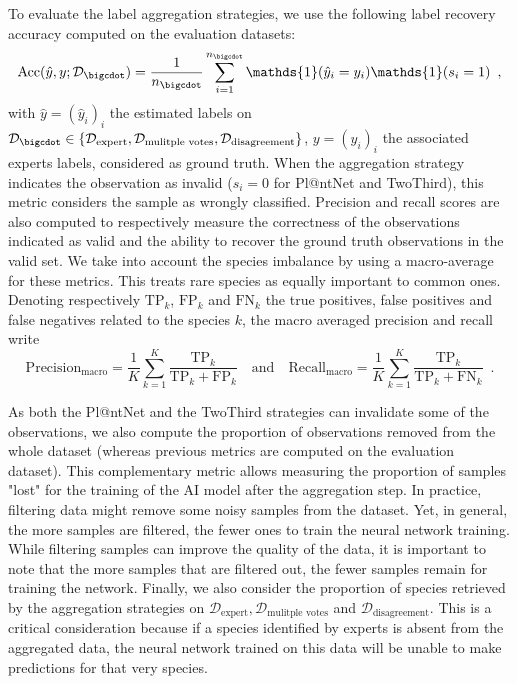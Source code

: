 To evaluate the label aggregation strategies, we use the following label recovery accuracy computed on the evaluation datasets:
\begin{equation*}
    \mathrm{Acc}(\hat y, y; \mathcal{D}_{\bigcdot}) = \frac{1}{n_{\bigcdot}} \sum_{i=1}^{n_{\bigcdot}} \mathds{1}(\hat{y}_i = y_i)\mathds{1}(s_i=1) \enspace,
\end{equation*}
with $\hat y=(\hat{y}_i)_i$ the estimated labels on $\mathcal{D}_{\bigcdot} \in \{\mathcal{D}_\text{expert}, \mathcal{D}_{\text{mulitple votes}}, \mathcal{D}_{\text{disagreement}}\}$, $y=(y_i)_i$ the associated experts labels, considered as ground truth.
When the aggregation strategy indicates the observation as invalid ($s_i=0$ for Pl@ntNet and TwoThird), this metric considers the sample as wrongly classified.
Precision and recall scores are also computed to respectively measure the correctness of the observations indicated as valid and the ability to recover the ground truth observations in the valid set.
We take into account the species imbalance by using a macro-average for these metrics. This treats rare species as equally important to common ones. Denoting respectively $\mathrm{TP}_k$, $\mathrm{FP}_k$ and $\mathrm{FN}_k$ the true positives, false positives and false negatives related to the species $k$, the macro averaged precision and recall write
\[
\mathrm{Precision}_{\mathrm{macro}}=\frac{1}{K}\sum_{k=1}^K \frac{\mathrm{TP}_k}{\mathrm{TP}_k + \mathrm{FP}_k} \quad \text{and} \quad \mathrm{Recall}_{\mathrm{macro}}=\frac{1}{K}\sum_{k=1}^K \frac{\mathrm{TP}_k}{\mathrm{TP}_k + \mathrm{FN}_k} \enspace.
\]

As both the Pl@ntNet and the TwoThird strategies can invalidate some of the observations, we also compute the proportion of observations removed from the whole dataset (whereas previous metrics are computed on the evaluation dataset). This complementary metric allows measuring the proportion of samples "lost" for the training of the AI model after the aggregation step.
In practice, filtering data might remove some noisy samples from the dataset. Yet, in general, the more samples are filtered, the fewer ones to train the neural network training.
While filtering samples can improve the quality of the data, it is important to note that the more samples that are filtered out, the fewer samples remain for training the network.
Finally, we also consider the proportion of species retrieved by the aggregation strategies on $\mathcal{D}_\text{expert}, \mathcal{D}_{\text{mulitple votes}}$ and $\mathcal{D}_{\text{disagreement}}$. This is a critical consideration because if a species identified by experts is absent from the aggregated data, the neural network trained on this data will be unable to make predictions for that very species.

